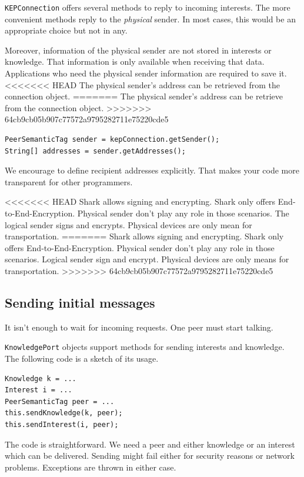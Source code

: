 {\tt KEPConnection} offers several methods to reply to incoming interests. The more convenient methods reply to the {\it physical} sender. In most cases, this would be an appropriate choice but not in any. 

Moreover, information of the physical sender are not stored in interests or knowledge. That information is only available when receiving that data.
Applications who need the physical sender information are required to save it.
<<<<<<< HEAD
The physical sender's address can be retrieved from the connection object.
=======
The physical sender's address can be retrieve from the connection object.
>>>>>>> 64cb9cb05b907c77572a9795282711e75220cde5

\begin{verbatim}
PeerSemanticTag sender = kepConnection.getSender();
String[] addresses = sender.getAddresses();
\end{verbatim}

We encourage to define recipient addresses explicitly. That makes your code more transparent for other programmers.

<<<<<<< HEAD
Shark allows signing and encrypting. Shark only offers End-to-End-Encryption. Physical sender don't play any role in those scenarios. The logical sender signs and encrypts. Physical devices are only mean for transportation.
=======
Shark allows signing and encrypting. Shark only offers End-to-End-Encryption. Physical sender don't play any role in those scenarios. Logical sender sign and encrypt. Physical devices are only means for transportation.
>>>>>>> 64cb9cb05b907c77572a9795282711e75220cde5

\subsection{Sending initial messages}
It isn't enough to wait for incoming requests. One peer must start talking.

{\tt KnowledgePort} objects support methods for sending interests and knowledge. The following code is a sketch of its usage.

\begin{verbatim}
Knowledge k = ...
Interest i = ...
PeerSemanticTag peer = ...
this.sendKnowledge(k, peer);
this.sendInterest(i, peer);
\end{verbatim}

The code is straightforward. We need a peer and either knowledge or an interest which can be delivered. Sending might fail either for security reasons or network problems. Exceptions are thrown in either case.

